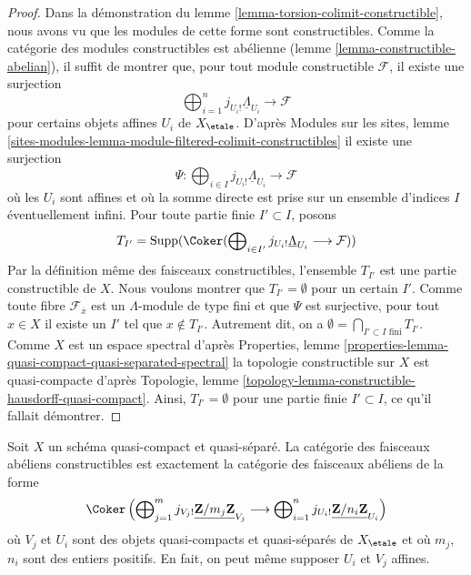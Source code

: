 \begin{proof}
Dans la démonstration du lemme \ref{lemma-torsion-colimit-constructible},
nous avons vu que les modules de cette forme sont constructibles. Comme la
catégorie des modules constructibles est abélienne
(lemme \ref{lemma-constructible-abelian}),
il suffit de montrer que, pour tout module constructible $\mathcal{F}$,
il existe une surjection
$$
\bigoplus\nolimits_{i = 1}^n j_{U_i!}\underline{\Lambda}_{U_i}
\longrightarrow \mathcal{F}
$$
pour certains objets affines $U_i$ de $X_\etale$. D'après
Modules sur les sites, lemme
\ref{sites-modules-lemma-module-filtered-colimit-constructibles}
il existe une surjection
$$
\Psi :
\bigoplus\nolimits_{i \in I} j_{U_i!}\underline{\Lambda}_{U_i}
\longrightarrow
\mathcal{F}
$$
où les $U_i$ sont affines et où la somme directe est prise sur un
ensemble d'indices $I$ éventuellement infini. Pour toute partie finie $I' \subset I$, posons
$$
T_{I'} = \text{Supp}(\Coker(
\bigoplus\nolimits_{i \in I'} j_{U_i!}\underline{\Lambda}_{U_i}
\longrightarrow \mathcal{F}))
$$
Par la définition même des faisceaux constructibles, l'ensemble $T_{I'}$
est une partie constructible de $X$. Nous voulons montrer que $T_{I'} = \emptyset$
pour un certain $I'$. Comme toute fibre $\mathcal{F}_{\overline{x}}$ est
un $\Lambda$-module de type fini et que $\Psi$ est surjective, pour
tout $x \in X$ il existe un $I'$ tel que $x \not \in T_{I'}$.
Autrement dit, on a
$\emptyset = \bigcap_{I' \subset I\text{ fini}} T_{I'}$. Comme
$X$ est un espace spectral d'après Properties, lemme
\ref{properties-lemma-quasi-compact-quasi-separated-spectral}
la topologie constructible sur $X$ est quasi-compacte d'après
Topologie, lemme \ref{topology-lemma-constructible-hausdorff-quasi-compact}.
Ainsi, $T_{I'} = \emptyset$ pour une partie finie $I' \subset I$,
ce qu'il fallait démontrer.
\end{proof}

\begin{lemma}
\label{lemma-category-constructible-abelian}
Soit $X$ un schéma quasi-compact et quasi-séparé. La catégorie des
faisceaux abéliens constructibles est exactement la catégorie des faisceaux
abéliens de la forme
$$
\Coker\left(
\bigoplus\nolimits_{j = 1}^m
j_{V_j!}\underline{\mathbf{Z}/m_j\mathbf{Z}}_{V_j}
\longrightarrow
\bigoplus\nolimits_{i = 1}^n
j_{U_i!}\underline{\mathbf{Z}/n_i\mathbf{Z}}_{U_i}
\right)
$$
où $V_j$ et $U_i$ sont des objets quasi-compacts et quasi-séparés de
$X_\etale$ et où $m_j$, $n_i$ sont des entiers positifs.
En fait, on peut même supposer $U_i$ et $V_j$ affines.
\end{lemma}

